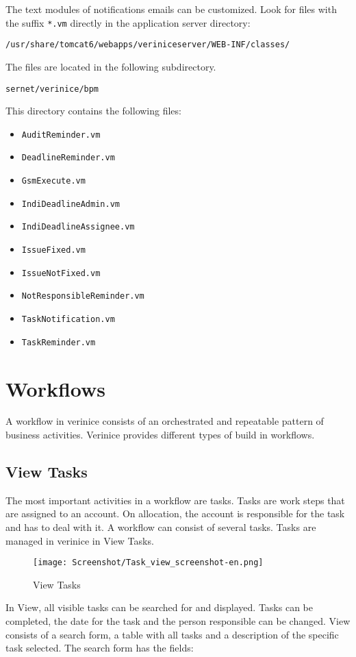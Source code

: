 \documentclass[a4paper,10pt]{book}
\begin{document}
The text modules of notifications emails can be customized. Look for
files with the suffix \texttt{*.vm} directly in the application server
directory:

\texttt{/usr/share/tomcat6/webapps/veriniceserver/WEB-INF/classes/}

The files are located in the following subdirectory.

\texttt{sernet/verinice/bpm}

This directory contains the following files:

\begin{itemize}
  \item \texttt{AuditReminder.vm}
  \item \texttt{DeadlineReminder.vm}
  \item \texttt{GsmExecute.vm}
  \item \texttt{IndiDeadlineAdmin.vm}
  \item \texttt{IndiDeadlineAssignee.vm}
  \item \texttt{IssueFixed.vm}
  \item \texttt{IssueNotFixed.vm}
  \item \texttt{NotResponsibleReminder.vm}
  \item \texttt{TaskNotification.vm}
  \item \texttt{TaskReminder.vm}
\end{itemize}

\section{Workflows}
A workflow in verinice consists of an orchestrated and repeatable pattern of business activities. Verinice provides different types of build in workflows.

\subsection{View Tasks}

The most important activities in a workflow are tasks. Tasks are work steps that are assigned to an account. On allocation, the account is responsible for the task and has to deal with it. A workflow can consist of several tasks. Tasks are managed in verinice in View Tasks.
\begin{figure}[htb!]
  \centering
  \texttt{[image: Screenshot/Task\_view\_screenshot-en.png]}
  \caption{\label{fig:view-tasks} View Tasks}
\end{figure}
In View, all visible tasks can be searched for and displayed. Tasks can be completed, the date for the task and the person responsible can be changed. View consists of a search form, a table with all tasks and a description of the specific task selected. The search form has the fields:
\end{document}
